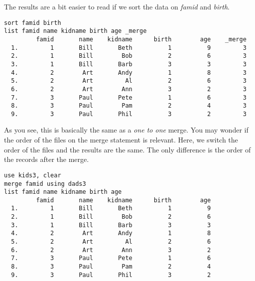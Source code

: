 The results are a bit easier to read if we sort the data on \textit{famid} and \textit{birth}.

\begin{lstlisting}
sort famid birth
list famid name kidname birth age _merge
         famid       name    kidname      birth        age    _merge
  1.         1       Bill       Beth          1          9         3
  2.         1       Bill        Bob          2          6         3
  3.         1       Bill       Barb          3          3         3
  4.         2        Art       Andy          1          8         3
  5.         2        Art         Al          2          6         3
  6.         2        Art        Ann          3          2         3
  7.         3       Paul       Pete          1          6         3
  8.         3       Paul        Pam          2          4         3
  9.         3       Paul       Phil          3          2         3
\end{lstlisting}

As you see, this is basically the same as a \textit{one to one} merge. You may wonder if the order of the files on the merge statement is relevant. Here, we switch the order of the files and the results are the same. The only difference is the order of the records after the merge.

\begin{lstlisting}
use kids3, clear
merge famid using dads3
list famid name kidname birth age
         famid       name    kidname      birth        age
  1.         1       Bill       Beth          1          9
  2.         1       Bill        Bob          2          6
  3.         1       Bill       Barb          3          3
  4.         2        Art       Andy          1          8
  5.         2        Art         Al          2          6
  6.         2        Art        Ann          3          2
  7.         3       Paul       Pete          1          6
  8.         3       Paul        Pam          2          4
  9.         3       Paul       Phil          3          2
\end{lstlisting}

